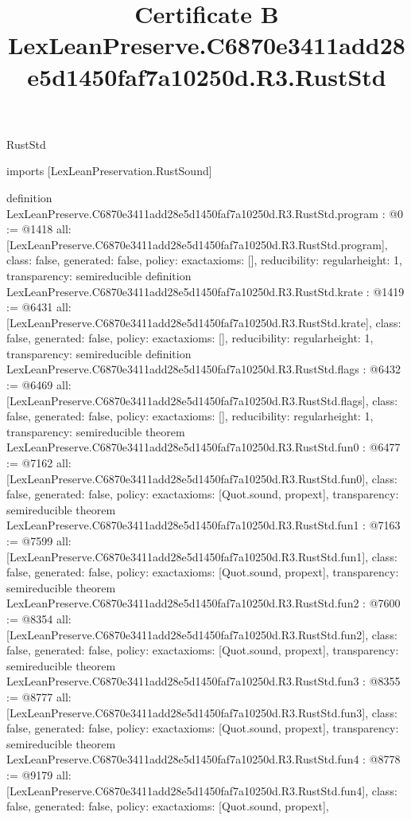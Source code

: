 \begin{lexlean}{RustStd}
\title{Certificate B LexLeanPreserve.C6870e3411add28e5d1450faf7a10250d.R3.RustStd}
\begin{coremodule}
imports [LexLeanPreservation.RustSound]

definition LexLeanPreserve.C6870e3411add28e5d1450faf7a10250d.R3.RustStd.program : @0 := @1418 {
  all: [LexLeanPreserve.C6870e3411add28e5d1450faf7a10250d.R3.RustStd.program],
  class: false,
  generated: false,
  policy: exact{axioms: []},
  reducibility: regular{height: 1},
  transparency: semireducible
}
definition LexLeanPreserve.C6870e3411add28e5d1450faf7a10250d.R3.RustStd.krate : @1419 := @6431 {
  all: [LexLeanPreserve.C6870e3411add28e5d1450faf7a10250d.R3.RustStd.krate],
  class: false,
  generated: false,
  policy: exact{axioms: []},
  reducibility: regular{height: 1},
  transparency: semireducible
}
definition LexLeanPreserve.C6870e3411add28e5d1450faf7a10250d.R3.RustStd.flags : @6432 := @6469 {
  all: [LexLeanPreserve.C6870e3411add28e5d1450faf7a10250d.R3.RustStd.flags],
  class: false,
  generated: false,
  policy: exact{axioms: []},
  reducibility: regular{height: 1},
  transparency: semireducible
}
theorem LexLeanPreserve.C6870e3411add28e5d1450faf7a10250d.R3.RustStd.fun0 : @6477 := @7162 {
  all: [LexLeanPreserve.C6870e3411add28e5d1450faf7a10250d.R3.RustStd.fun0],
  class: false,
  generated: false,
  policy: exact{axioms: [Quot.sound, propext]},
  transparency: semireducible
}
theorem LexLeanPreserve.C6870e3411add28e5d1450faf7a10250d.R3.RustStd.fun1 : @7163 := @7599 {
  all: [LexLeanPreserve.C6870e3411add28e5d1450faf7a10250d.R3.RustStd.fun1],
  class: false,
  generated: false,
  policy: exact{axioms: [Quot.sound, propext]},
  transparency: semireducible
}
theorem LexLeanPreserve.C6870e3411add28e5d1450faf7a10250d.R3.RustStd.fun2 : @7600 := @8354 {
  all: [LexLeanPreserve.C6870e3411add28e5d1450faf7a10250d.R3.RustStd.fun2],
  class: false,
  generated: false,
  policy: exact{axioms: [Quot.sound, propext]},
  transparency: semireducible
}
theorem LexLeanPreserve.C6870e3411add28e5d1450faf7a10250d.R3.RustStd.fun3 : @8355 := @8777 {
  all: [LexLeanPreserve.C6870e3411add28e5d1450faf7a10250d.R3.RustStd.fun3],
  class: false,
  generated: false,
  policy: exact{axioms: [Quot.sound, propext]},
  transparency: semireducible
}
theorem LexLeanPreserve.C6870e3411add28e5d1450faf7a10250d.R3.RustStd.fun4 : @8778 := @9179 {
  all: [LexLeanPreserve.C6870e3411add28e5d1450faf7a10250d.R3.RustStd.fun4],
  class: false,
  generated: false,
  policy: exact{axioms: [Quot.sound, propext]},
}
\end{coremodule}
\end{lexlean}
